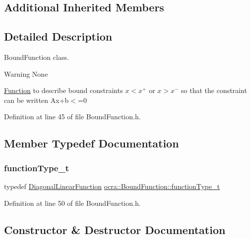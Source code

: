 \subsection*{Additional Inherited Members}


\subsection{Detailed Description}
Bound\+Function class. 

\begin{DoxyWarning}{Warning}
None
\end{DoxyWarning}
\hyperlink{classocra_1_1Function}{Function} to describe bound constraints $ x<x^+ $ or $ x>x^- $ so that the constraint can be written Ax+b$<$=0 

Definition at line 45 of file Bound\+Function.\+h.



\subsection{Member Typedef Documentation}
\hypertarget{classocra_1_1BoundFunction_acba2ac4d2f6caf04054590615a41ac21}{}\label{classocra_1_1BoundFunction_acba2ac4d2f6caf04054590615a41ac21} 
\subsubsection{\texorpdfstring{function\+Type\+\_\+t}{functionType\_t}}
{\footnotesize\ttfamily typedef \hyperlink{classocra_1_1DiagonalLinearFunction}{Diagonal\+Linear\+Function} \hyperlink{classocra_1_1BoundFunction_acba2ac4d2f6caf04054590615a41ac21}{ocra\+::\+Bound\+Function\+::function\+Type\+\_\+t}}



Definition at line 50 of file Bound\+Function.\+h.



\subsection{Constructor \& Destructor Documentation}
\hypertarget{classocra_1_1BoundFunction_a7dc079453fdb607b46295246153481fd}{}\label{classocra_1_1BoundFunction_a7dc079453fdb607b46295246153481fd} 
